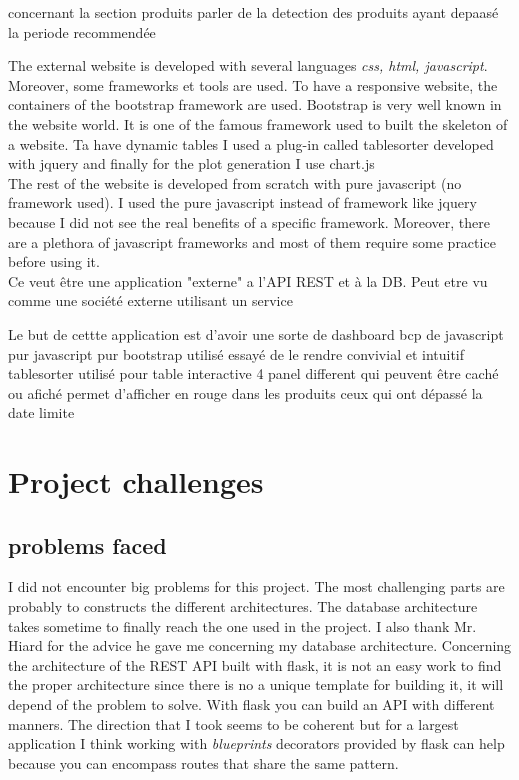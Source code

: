 
concernant la section produits parler de la detection des produits ayant depaasé la periode recommendée



The external website is developed with several languages \textit{css, html, javascript}. Moreover, some frameworks et tools are used. To have a responsive website, the containers of the bootstrap framework are used. Bootstrap is very well known in the website world. It is one of the famous framework used to built the skeleton of a website. Ta have dynamic tables I used a plug-in called tablesorter developed with jquery  %
and finally for the plot generation I use chart.js \\

The rest of the website is developed from scratch with pure javascript (no framework used). I used the pure javascript instead of framework like jquery because I did not see the real benefits of a specific framework. Moreover, there are a plethora of javascript frameworks and most of them require some practice before using it.\\



Ce veut être une application "externe" a l'API REST et à la DB. Peut etre vu comme une société externe utilisant un service

Le but de cettte application est d'avoir une sorte de dashboard
bcp de javascript pur
javascript pur
bootstrap utilisé
essayé de le rendre convivial et intuitif
tablesorter utilisé pour table interactive 
4 panel different qui peuvent être caché ou afiché
permet d'afficher en rouge dans les produits ceux qui ont dépassé la date limite
\section{Project challenges}
\subsection{problems faced}
I did not encounter big problems for this project. The most challenging parts are probably to constructs the different architectures. The database architecture takes sometime to finally reach the one used in the project. I also thank Mr. Hiard for the advice he gave me concerning my database architecture. Concerning the architecture of the REST API built with flask, it is not an easy work to find the proper architecture since there is no a unique template for building it, it will depend of the problem to solve. With flask you can build an API with different manners. The direction that I took seems to be coherent but for a largest application I think working with \textit{blueprints} decorators provided by flask can help because you can encompass routes that share the same pattern.\\

